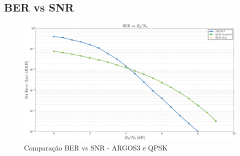 \begin{apendicesenv}
\chapter{BER vs SNR}

\begin{figure}[H]
	\centering
	\caption{Comparação BER vs SNR - ARGOS3 e QPSK}\label{fig:ber_snr}
	\includegraphics[width=\linewidth]{assets/apendice/ber_vs_ebn0.pdf}
\end{figure}

\end{apendicesenv}
